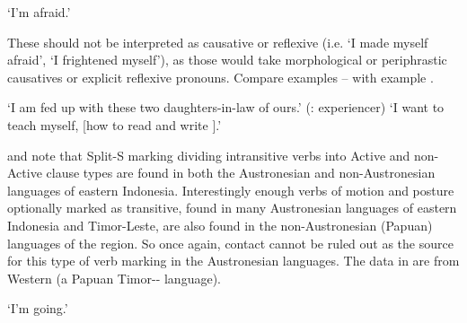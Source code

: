 \begin{exe}
			\glt	‘I'm afraid.’
						\label{ex:07-09}
\end{exe}

These should not be interpreted as causative or reflexive (i.e.
‘I made myself afraid’,
‘I frightened myself’), as those would take morphological or
periphrastic causatives or explicit reflexive pronouns.
Compare  examples -- with  example .

\begin{exe}
			\glt	‘I am fed up with these two daughters-in-law of ours.’ \hfill{(: experiencer)}
						\label{ex:07-10}
			\glt	‘I want to teach myself, [how to read and write ].'
						\label{ex:07-11}
\end{exe}

\citet{Klamer2008} and \citet{Schapper2015} note that Split-S
marking dividing intransitive verbs into Active
and non-Active clause types are found in both the Austronesian
and non-Austronesian languages of eastern Indonesia.
Interestingly enough verbs of motion
and posture optionally marked as transitive,
found in many Austronesian languages of eastern Indonesia
and Timor-Leste, are also found in the non-Austronesian (Papuan)
languages of the region.
So once again, contact cannot be ruled out as the source for
this type of verb marking in the Austronesian languages.
The data in  are from Western  (a Papuan Timor--
language).

\begin{exe}
			\glt	‘I'm going.’
						\label{ex:07-12}
\end{exe}

